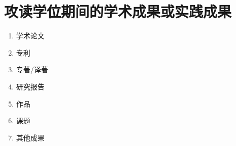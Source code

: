 \chapter{攻读学位期间的学术成果或实践成果}

\begin{enumerate}
    \item 学术论文
    \item 专利
    \item 专著/译著
    \item 研究报告
    \item 作品
    \item 课题
    \item 其他成果
\end{enumerate}
